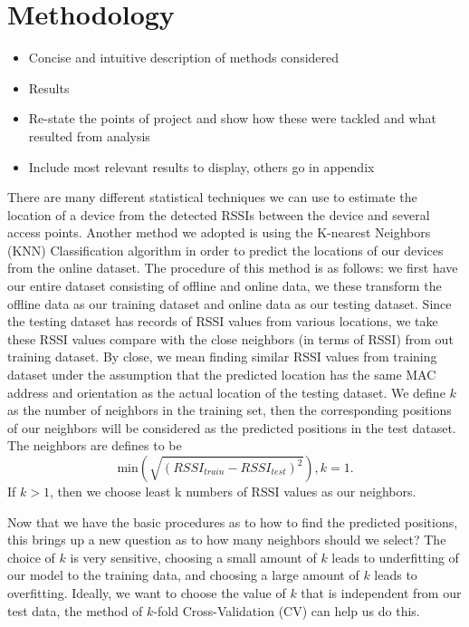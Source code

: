 \documentclass[12pt, conference]{IEEEtran}
\begin{document}
\section{Methodology}
\begin{itemize}
  \item Concise and intuitive description of methods considered
  \item Results
  \item Re-state the points of project and show how these were tackled and what resulted from analysis
  \item Include most relevant results to display, others go in appendix
\end{itemize}
\newline

There are many different statistical techniques we can use to estimate the location of a device from the detected RSSIs between the device and several access points. Another method we adopted is using the K-nearest Neighbors (KNN) Classification algorithm in order to predict the locations of our devices from the online dataset. The procedure of this method is as follows: we first have our entire dataset consisting of offline and online data, we these transform the offline data as our training dataset and online data as our testing dataset. Since the testing dataset has records of RSSI values from various locations, we take these RSSI values compare with the close neighbors (in terms of RSSI) from out training dataset. By close, we mean finding similar RSSI values from training dataset under the assumption that the predicted location has the same MAC address and orientation as the actual location of the testing dataset. We define $k$ as the number of neighbors in the training set, then the corresponding positions of our neighbors will be considered as the predicted positions in the test dataset. The neighbors are defines to be 
$$
  \text{min}\left(\sqrt{(RSSI_{train}-RSSI_{test})^2}\right), k=1.
$$ 
If $k>1$, then we choose least k numbers of RSSI values as our neighbors.


Now that we have the basic procedures as to how to find the predicted positions, this brings up a new question as to how many neighbors should we select? The choice of $k$ is very sensitive, choosing a small amount of $k$ leads to underfitting of our model to the training data, and choosing a large amount of $k$ leads to overfitting. Ideally, we want to choose the value of $k$ that is independent from our test data, the method of $k$-fold Cross-Validation (CV) can help us do this.
\end{document}
